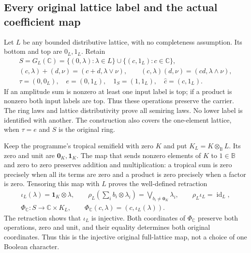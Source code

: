 \documentclass[11pt]{article}
\theoremstyle{definition}
\begin{document}
\subsection{Every original lattice label and the actual coefficient map}

Let $L$ be any bounded distributive lattice, with no completeness
assumption. Its bottom and top are $0_L,1_L$. Retain
\begin{equation}\tag{THS16}
\begin{gathered}
 S=G_L(\mathbb C)=\{(0,\lambda):\lambda\in L\}
                 \cup\{(c,1_L):c\in\mathbb C\},\\
 (c,\lambda)+(d,\nu)=(c+d,\lambda\vee\nu),\qquad
 (c,\lambda)(d,\nu)=(cd,\lambda\wedge\nu),\\
 \tau=(0,0_L),\quad e=(0,1_L),\quad
 1_S=(1,1_L),\quad\widehat c=(c,1_L).
\end{gathered}
\end{equation}
If an amplitude sum is nonzero at least one input label is top;
if a product is nonzero both input labels are top. Thus these
operations preserve the carrier. The ring laws and lattice
distributivity prove all semiring laws. No lower label is
identified with another. The construction also covers the
one-element lattice, when $\tau=e$ and $S$ is the original ring.

Keep the programme's tropical semifield with zero $K$ and put
$K_L=K\otimes_{\mathbb B}L$. Its zero and unit are
$\mathbf0_K,\mathbf1_K$. The map that sends nonzero elements
of $K$ to $1\in\mathbb B$ and zero to zero preserves addition
and multiplication: a tropical sum is zero precisely when all
its terms are zero and a product is zero precisely when a
factor is zero. Tensoring this map with $L$ proves the
well-defined retraction
\begin{equation}\tag{THS17}
\begin{gathered}
 \iota_L(\lambda)=\mathbf1_K\otimes\lambda,\qquad
 \rho_L\left(\sum_i b_i\otimes\lambda_i\right)
       =\bigvee_{b_i\ne\mathbf0_K}\lambda_i,\qquad
 \rho_L\iota_L=\operatorname{id}_L,\\
 \Phi_{\mathbb C}:S\longrightarrow\mathbb C\times K_L,
 \qquad\Phi_{\mathbb C}(c,\lambda)=(c,\iota_L(\lambda)).
\end{gathered}
\end{equation}
The retraction shows that $\iota_L$ is injective. Both coordinates
of $\Phi_{\mathbb C}$ preserve both operations, zero and unit,
and their equality determines both original coordinates.
Thus this is the injective original full-lattice map, not a
choice of one Boolean character.
\end{document}
